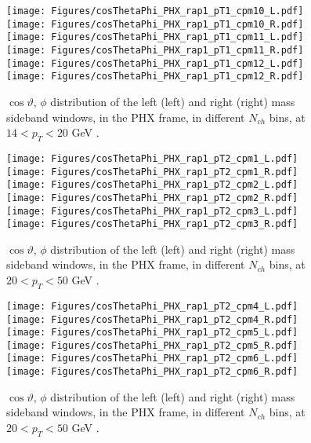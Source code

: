\documentclass[12pt]{article}
\begin{document}
\begin{figure}[htbp]
\centering
\texttt{[image: Figures/cosThetaPhi\_PHX\_rap1\_pT1\_cpm10\_L.pdf]}
\texttt{[image: Figures/cosThetaPhi\_PHX\_rap1\_pT1\_cpm10\_R.pdf]}
\texttt{[image: Figures/cosThetaPhi\_PHX\_rap1\_pT1\_cpm11\_L.pdf]}
\texttt{[image: Figures/cosThetaPhi\_PHX\_rap1\_pT1\_cpm11\_R.pdf]}
\texttt{[image: Figures/cosThetaPhi\_PHX\_rap1\_pT1\_cpm12\_L.pdf]}
\texttt{[image: Figures/cosThetaPhi\_PHX\_rap1\_pT1\_cpm12\_R.pdf]}
\caption{$\cos\vartheta,\,\phi$ distribution of the left (left) and
  right (right) mass sideband windows, in the PHX frame, in different
  $N_{ch}$ bins, at $14 < p_{T} < 20$ GeV .}
\end{figure}
\clearpage

\begin{figure}[htbp]
\centering
\texttt{[image: Figures/cosThetaPhi\_PHX\_rap1\_pT2\_cpm1\_L.pdf]}
\texttt{[image: Figures/cosThetaPhi\_PHX\_rap1\_pT2\_cpm1\_R.pdf]}
\texttt{[image: Figures/cosThetaPhi\_PHX\_rap1\_pT2\_cpm2\_L.pdf]}
\texttt{[image: Figures/cosThetaPhi\_PHX\_rap1\_pT2\_cpm2\_R.pdf]}
\texttt{[image: Figures/cosThetaPhi\_PHX\_rap1\_pT2\_cpm3\_L.pdf]}
\texttt{[image: Figures/cosThetaPhi\_PHX\_rap1\_pT2\_cpm3\_R.pdf]}
\caption{$\cos\vartheta,\,\phi$ distribution of the left (left) and
  right (right) mass sideband windows, in the PHX frame, in different
  $N_{ch}$ bins, at $20 < p_{T} < 50$ GeV .}
\end{figure}
\clearpage

\begin{figure}[htbp]
\centering
\texttt{[image: Figures/cosThetaPhi\_PHX\_rap1\_pT2\_cpm4\_L.pdf]}
\texttt{[image: Figures/cosThetaPhi\_PHX\_rap1\_pT2\_cpm4\_R.pdf]}
\texttt{[image: Figures/cosThetaPhi\_PHX\_rap1\_pT2\_cpm5\_L.pdf]}
\texttt{[image: Figures/cosThetaPhi\_PHX\_rap1\_pT2\_cpm5\_R.pdf]}
\texttt{[image: Figures/cosThetaPhi\_PHX\_rap1\_pT2\_cpm6\_L.pdf]}
\texttt{[image: Figures/cosThetaPhi\_PHX\_rap1\_pT2\_cpm6\_R.pdf]}
\caption{$\cos\vartheta,\,\phi$ distribution of the left (left) and
  right (right) mass sideband windows, in the PHX frame, in different
  $N_{ch}$ bins, at $20 < p_{T} < 50$ GeV .}
\end{figure}
\clearpage
\end{document}
